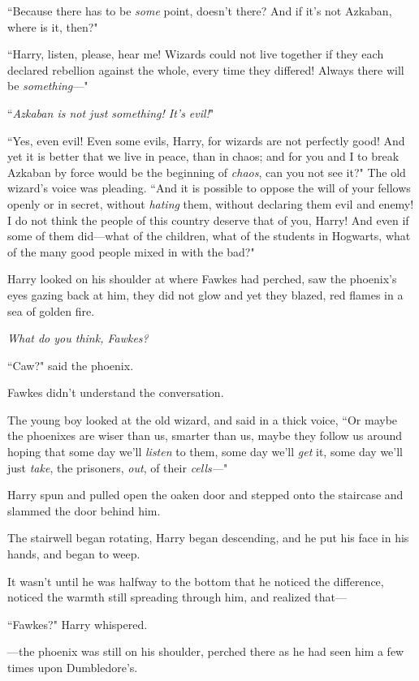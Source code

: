 ``Because there has to be \emph{some} point, doesn't there? And if it's not Azkaban, where is it, then?"

``Harry, listen, please, hear me! Wizards could not live together if they each declared rebellion against the whole, every time they differed! Always there will be \emph{something}---"

``\emph{Azkaban is not just something! It's evil!}"

``Yes, even evil! Even some evils, Harry, for wizards are not perfectly good! And yet it is better that we live in peace, than in chaos; and for you and I to break Azkaban by force would be the beginning of \emph{chaos}, can you not see it?" The old wizard's voice was pleading. ``And it is possible to oppose the will of your fellows openly or in secret, without \emph{hating} them, without declaring them evil and enemy! I do not think the people of this country deserve that of you, Harry! And even if some of them did---what of the children, what of the students in Hogwarts, what of the many good people mixed in with the bad?"

Harry looked on his shoulder at where Fawkes had perched, saw the phoenix's eyes gazing back at him, they did not glow and yet they blazed, red flames in a sea of golden fire.

\emph{What do you think, Fawkes?}

``Caw?" said the phoenix.

Fawkes didn't understand the conversation.

The young boy looked at the old wizard, and said in a thick voice, ``Or maybe the phoenixes are wiser than us, smarter than us, maybe they follow us around hoping that some day we'll \emph{listen} to them, some day we'll \emph{get} it, some day we'll just \emph{take}, the prisoners, \emph{out}, of their \emph{cells---}"

Harry spun and pulled open the oaken door and stepped onto the staircase and slammed the door behind him.

The stairwell began rotating, Harry began descending, and he put his face in his hands, and began to weep.

It wasn't until he was halfway to the bottom that he noticed the difference, noticed the warmth still spreading through him, and realized that---

``Fawkes?" Harry whispered.

---the phoenix was still on his shoulder, perched there as he had seen him a few times upon Dumbledore's.

